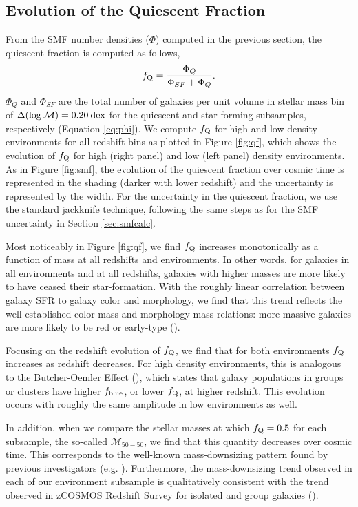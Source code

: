 \documentclass{emulateapj}
\begin{document}
\subsection{Evolution of the Quiescent Fraction} \label{sec:qfevol}
From the SMF number densities ($\Phi$) computed in the previous section, the quiescent fraction is computed as follows, 
\begin{equation}
f_{\rm{Q}} = \frac{\Phi_{Q}}{\Phi_{SF}+\Phi_{Q}}.
\end{equation}
$\Phi_{Q}$ and $\Phi_{SF}$ are the total number of galaxies per unit
volume in stellar mass bin of $\Delta(\rm{log} \: \mathcal{M}) = 0.20
\: \mathrm{dex}$ for the quiescent and star-forming subsamples,
respectively (Equation \ref{eq:phi}). We compute $f_{\rm{Q}}$ for high
and low density environments for all redshift bins as plotted in
Figure \ref{fig:qf}, which shows the evolution of $f_{\rm{Q}}$ for
high (right panel) and low (left panel) density environments. As in
Figure \ref{fig:smf}, the evolution of the quiescent fraction over
cosmic time is represented in the shading (darker with lower redshift)
and the uncertainty is represented by the width. For the uncertainty
in the quiescent fraction, we use the standard jackknife technique,
following the same steps as for the SMF uncertainty in Section \ref{sec:smfcalc}. 

Most noticeably in Figure \ref{fig:qf}, we find $f_{\rm{Q}}$ increases
monotonically as a function of mass at all redshifts and
environments. In other words, for galaxies in all environments and at all redshifts, galaxies with higher
masses are more likely to have ceased their star-formation. With the roughly linear correlation between galaxy SFR to galaxy color and morphology, we find that this trend reflects the well established color-mass and morphology-mass relations: more massive galaxies are more likely to be red or early-type (\citealt{blanton09a}). 

Focusing on the redshift evolution of $f_{\rm{Q}}$, we find that for
both environments $f_{\rm{Q}}$ increases as redshift decreases. For
high density environments, this is analogous to the Butcher-Oemler
Effect (\citealt{Butcher:1984aa}), which states that galaxy
populations in groups or clusters have higher $f_{\rm{blue}}$, or
lower $f_{\rm{Q}}$, at higher redshift. This evolution occurs with
roughly the same amplitude in low environments as well.

In addition, when we compare the stellar masses at which $f_{\rm{Q}} =
0.5$ for each subsample, the so-called $\mathcal{M}_{50-50}$, we find
that this quantity decreases over cosmic time. This corresponds to the
well-known mass-downsizing pattern found by previous investigators
(e.g. \citealt{bundy06a}). Furthermore, the mass-downsizing trend
observed in each of our environment subsample is qualitatively
consistent with the trend observed in zCOSMOS Redshift Survey for
isolated and group galaxies (\citealt{Iovino:2010aa}).
\end{document}
